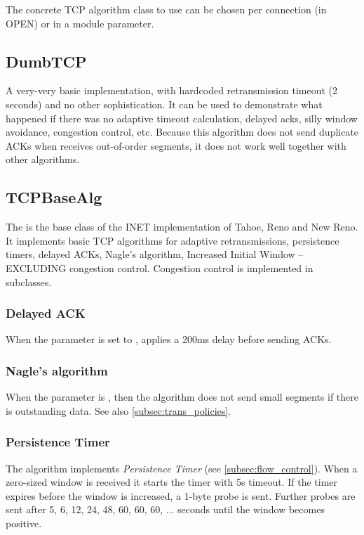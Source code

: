 The concrete TCP algorithm class to use can be chosen per connection (in OPEN)
or in a module parameter.

\subsection{DumbTCP}

A very-very basic  implementation, with hardcoded
retransmission timeout (2 seconds) and no other sophistication. It can be
used to demonstrate what happened if there was no adaptive
timeout calculation, delayed acks, silly window avoidance,
congestion control, etc. Because this algorithm does not
send duplicate ACKs when receives out-of-order segments,
it does not work well together with other algorithms.

\subsection{TCPBaseAlg}

The  is the base class of the INET implementation
of Tahoe, Reno and New Reno. It implements basic TCP
algorithms for adaptive retransmissions, persistence timers,
delayed ACKs, Nagle's algorithm, Increased Initial Window
-- EXCLUDING congestion control. Congestion control
is implemented in subclasses.

\subsubsection*{Delayed ACK}

When the  parameter is set to ,
 applies a 200ms delay before sending ACKs.

\subsubsection*{Nagle's algorithm}

When the  parameter is , then
the algorithm does not send small segments if there is outstanding
data. See also \ref{subsec:trans_policies}.

\subsubsection*{Persistence Timer}

The algorithm implements \emph{Persistence Timer} (see \ref{subsec:flow_control}).
When a zero-sized window is received it starts the timer with 5s timeout.
If the timer expires before the window is increased, a 1-byte probe is
sent. Further probes are sent after 5, 6, 12, 24, 48, 60, 60, 60, ...
seconds until the window becomes positive.

